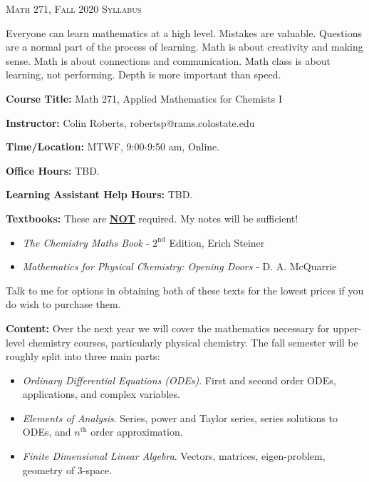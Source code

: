 \documentclass[12pt]{amsbook}
\begin{document}

\SetWatermarkText{
\begin{minipage}[c][8cm]{8cm}
\begin{center}
 
\end{center}
\end{minipage}
}




\begin{center}
   \textsc{\large Math 271, Fall 2020 Syllabus}
\end{center}
\vspace{.5cm}

Everyone can learn mathematics at a high level.
Mistakes are valuable.
Questions are a normal part of the process of learning.
Math is about creativity and making sense.
Math is about connections and communication.
Math class is about learning, not performing.
Depth is more important than speed.

\textbf{Course Title:} Math 271, Applied Mathematics for Chemists I

\textbf{Instructor:} Colin Roberts, robertsp@rams.colostate.edu

\textbf{Time/Location:} MTWF, 9:00-9:50 am, Online.  

\textbf{Office Hours:} TBD.

\textbf{Learning Assistant Help Hours:} TBD.

\textbf{Textbooks:} These are \underline{\textbf{NOT}} required.  My notes will be sufficient!
\begin{itemize}
    \item \emph{The Chemistry Maths Book} - $2^{\text{nd}}$ Edition, Erich Steiner
    \item \emph{Mathematics for Physical Chemistry: Opening Doors} - D. A. McQuarrie
\end{itemize}
Talk to me for options in obtaining both of these texts for the lowest prices if you do wish to purchase them. 

\textbf{Content:} Over the next year we will cover the mathematics necessary for upper-level chemistry courses, particularly physical chemistry. The fall semester will be roughly split into three main parts:
\begin{itemize}
    \item \emph{Ordinary Differential Equations (ODEs)}. First and second order ODEs, applications, and complex variables.
    \item \emph{Elements of Analysis}. Series, power and Taylor series, series solutions to ODEs, and $n^\textrm{th}$ order approximation.
    \item \emph{Finite Dimensional Linear Algebra}. Vectors, matrices, eigen-problem, geometry of 3-space.
\end{itemize}
\end{document}
